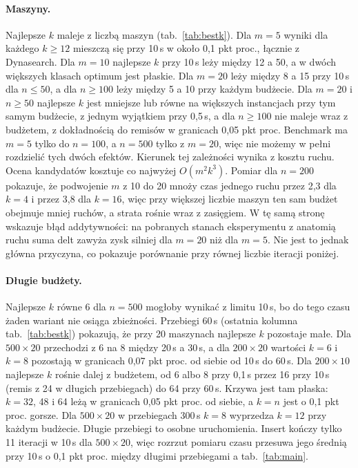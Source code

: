 \documentclass[letterpaper]{article} %
\theoremstyle{definition}
\begin{document}
\paragraph{Maszyny.} Najlepsze $k$ maleje z liczbą maszyn
(tab.~\ref{tab:bestk}). Dla $m=5$ wyniki dla każdego $k\geq 12$ mieszczą się
przy 10\,s w około 0,1 pkt proc., łącznie z Dynasearch. Dla $m=10$
najlepsze $k$ przy 10\,s leży między 12 a 50, a w dwóch większych
klasach optimum jest płaskie. Dla $m=20$ leży między 8 a 15
przy 10\,s dla
$n\leq 50$, a dla $n\geq 100$ leży między 5 a 10 przy każdym budżecie. Dla $m=20$ i $n\geq 50$ najlepsze $k$ jest mniejsze lub równe na większych instancjach przy tym samym budżecie, z jednym wyjątkiem przy 0,5\,s, a dla $n\geq 100$ nie maleje wraz z budżetem, z dokładnością do remisów w granicach 0,05 pkt proc. Benchmark ma $m=5$ tylko
do $n=100$, a $n=500$ tylko z $m=20$, więc nie możemy w pełni rozdzielić
tych dwóch efektów. Kierunek tej zależności wynika z kosztu ruchu. Ocena kandydatów kosztuje co najwyżej $O(m^2k^3)$. Pomiar dla $n=200$ pokazuje, że podwojenie $m$ z 10 do 20 mnoży czas jednego ruchu przez 2,3 dla $k=4$ i przez 3,8 dla $k=16$, więc przy większej liczbie maszyn ten sam budżet obejmuje mniej ruchów, a strata rośnie wraz z zasięgiem. W tę samą stronę wskazuje błąd addytywności:
na pobranych stanach eksperymentu z anatomią ruchu suma delt zawyża zysk
silniej dla $m=20$ niż dla $m=5$. Nie jest to jednak główna przyczyna, co
pokazuje porównanie przy równej liczbie iteracji poniżej.


\paragraph{Długie budżety.} Najlepsze $k$ równe 6 dla $n=500$ mogłoby
wynikać z limitu 10\,s, bo do tego czasu żaden wariant nie osiąga
zbieżności. Przebiegi 60\,s (ostatnia kolumna tab.~\ref{tab:bestk}) pokazują, że przy 20
maszynach najlepsze $k$ pozostaje małe. Dla $500\times 20$ przechodzi
z 6 na 8 między 20\,s a 30\,s, a dla $200\times 20$ wartości $k=6$
i $k=8$ pozostają w granicach 0,07 pkt proc. od siebie od 10\,s do 60\,s. Dla $200\times 10$ najlepsze $k$ rośnie dalej z budżetem,
od 6 albo 8 przy 0,1\,s przez 16 przy 10\,s (remis z 24 w długich
przebiegach) do 64 przy 60\,s. Krzywa jest tam płaska: $k=32$, 48 i 64 leżą
w granicach 0,05 pkt proc. od siebie, a $k=n$ jest o 0,1 pkt proc. gorsze.
Dla $500\times 20$ w przebiegach 300\,s $k=8$ wyprzedza $k=12$ przy każdym
budżecie. Długie przebiegi to osobne uruchomienia. Insert kończy tylko 11 iteracji w 10\,s dla
$500\times 20$, więc rozrzut pomiaru czasu przesuwa jego średnią przy 10\,s
o 0,1 pkt proc. między długimi przebiegami a tab.~\ref{tab:main}.
\end{document}
